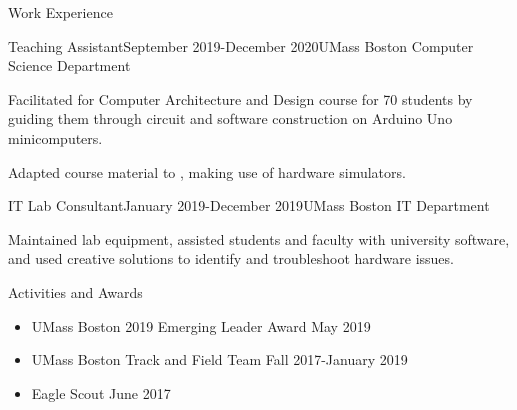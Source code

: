 \documentclass{resume} %
\begin{document}
\begin{Section}{Work Experience}

\begin{comment}
	\begin{Job}{Ambassador \& Peer Mentor}{September 2018-present}{UMass Boston Honors College}
			\item Create and manage the schedule for our team of six student ambassadors using \textbf{Google Sheets}.
			\item Coordinate with faculty, staff, and other ambassadors to plan and organize events for students.
			\item Meet with freshmen students both 1:1 and in groups to help them with scheduling, adjusting to college, and developing study skills.
	\end{Job}	
\end{comment}	

	\begin{Job}{Teaching Assistant}{September 2019-December 2020}{UMass Boston Computer Science Department}
			\item Facilitated  for Computer Architecture and Design course for 70 students by guiding them through circuit and software construction on Arduino Uno minicomputers.
			\item Adapted course material to , making use of hardware simulators. 
	\end{Job}
	
	
	\begin{Job}{IT Lab Consultant}{January 2019-December 2019}{UMass Boston IT Department}
		\item Maintained lab equipment, assisted students and faculty with university software, and used creative solutions to identify and troubleshoot hardware issues.
	\end{Job}
\begin{comment}
	\begin{Job}{Seafood Clerk}{June 2018-December 2018} {Shaw's Supermarkets}
		\item Consistently provided quality service to customers, assisted with inventory management.
	\end{Job}
\end{comment}
\end{Section}

\begin{Section}{Activities and Awards} \itemsep -3pt
	\begin{itemize}[leftmargin=*]
		\itemsep -0.5em %
		\item UMass Boston 2019 Emerging Leader Award             \hfill {May 2019}
		\item UMass Boston Track and Field Team                   \hfill {Fall 2017-January 2019}
		\item Eagle Scout                                         \hfill {June 2017} 
	\end{itemize}
\end{Section}
\end{document}
